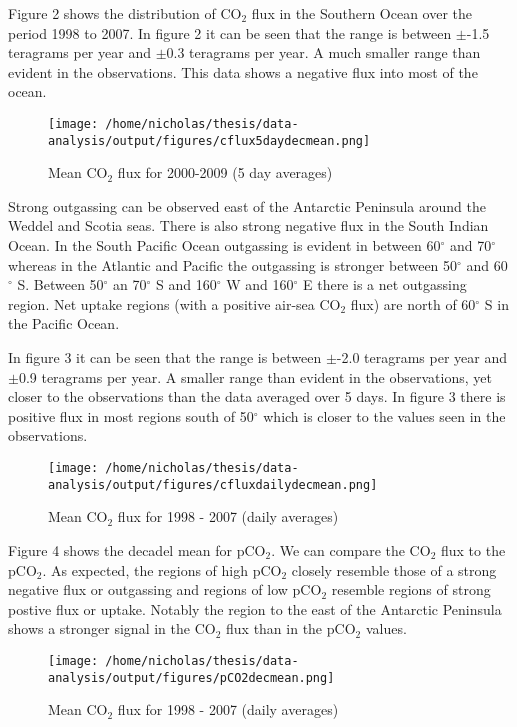 \documentclass[11pt, a4paper]{article}
\numberwithin{figure}{section}
\numberwithin{table}{section}
\begin{document}
Figure 2 shows the distribution of CO${_2}$ flux
in the Southern Ocean over the period 1998 to 2007. 
In figure 2 it can be seen that the range is between $\pm$-1.5 teragrams per year
and $\pm$0.3 teragrams per year. A much smaller range than evident in the observations.
This data shows a negative flux into most of the ocean.
  \begin{figure}[H]
  \caption{Mean CO$_2$ flux for 2000-2009 (5 day averages)}
  \centering
  \texttt{[image: /home/nicholas/thesis/data-analysis/output/figures/cflux5daydecmean.png]}
  \end{figure}
Strong outgassing can be 
observed east of the Antarctic Peninsula around the Weddel and Scotia seas. 
There is also strong negative flux in the South Indian Ocean. 
In the South 
Pacific Ocean outgassing is evident in between 60$^\circ$ and 70$^\circ$ whereas
in the Atlantic and Pacific the outgassing is stronger between 
50$^\circ$ and 60$^\circ$ S. 
Between 50$^\circ$ an 70$^\circ$ S and 160$^\circ$ W and 160$^\circ$ E there is 
a net outgassing region. 
Net uptake regions (with a positive air-sea CO$_2$ flux) are north 
of 60$^\circ$ S in the Pacific Ocean.

In figure 3 it can be seen that the range is between $\pm$-2.0 teragrams per year
and $\pm$0.9 teragrams per year. A smaller range than evident in the observations, yet closer to the observations than
the data averaged over 5 days. In figure 3 there is positive flux in most regions south of 50$^{\circ}$ which is closer 
to the values seen in the observations.
  \begin{figure}[H]
  \caption{Mean CO$_2$ flux for 1998 - 2007 (daily averages)}
  \centering
  \texttt{[image: /home/nicholas/thesis/data-analysis/output/figures/cfluxdailydecmean.png]}
  \end{figure}

Figure 4 shows the decadel mean for pCO$_2$. We can compare the CO$_2$ flux to the pCO$_2$. 
As expected, the regions of high pCO$_2$ closely resemble those of a strong negative flux or outgassing
and regions of low pCO$_2$ resemble regions of strong postive flux or uptake. 
Notably the region to the east of the Antarctic Peninsula shows a stronger signal in the CO$_2$ flux
than in the pCO$_2$ values.
  \begin{figure}[H]
  \caption{Mean CO$_2$ flux for 1998 - 2007 (daily averages)}
  \centering
  \texttt{[image: /home/nicholas/thesis/data-analysis/output/figures/pCO2decmean.png]}
  \end{figure}
  
\end{document}
